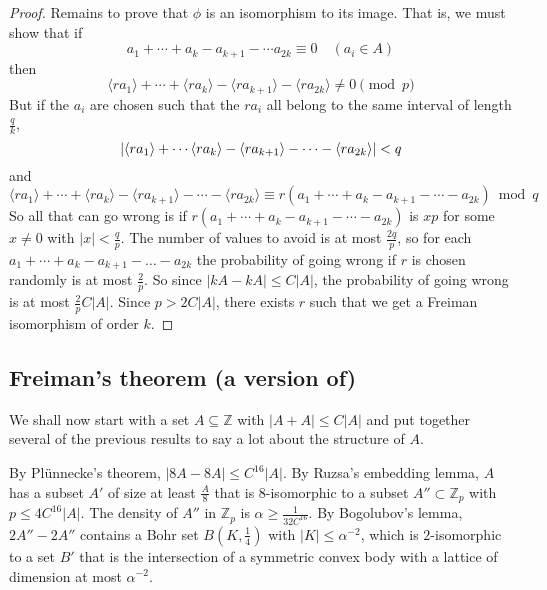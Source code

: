 \documentclass{article}
\newcommand{\1}[1]{\mathbbm{1}_{#1}}
\begin{document}
\begin{proof}
  Remains to prove that $\phi$ is an isomorphism to its image. That is, we must show that if
  \begin{equation*}
    a_1 + \dotsb + a_k - a_{k+1} - \dotsb a_{2k} \equiv 0 \quad (a_i \in A)
  \end{equation*}
  then
  \begin{equation*}
    \langle r a_1 \rangle + \dotsb + \langle r a_k \rangle - \langle r a_{k+1} \rangle - \langle r a_{2k} \rangle \neq 0 \pmod{p}
  \end{equation*}
  But if the $a_i$ are chosen such that the $r a_i$ all belong to the same interval of length $\frac{q}{k}$,
  \begin{equation*}
    |\langle r a_1 \rangle + \dotsb \langle r a_k \rangle - \langle r a_{k+1} \rangle - \dotsb - \langle r a_{2k} \rangle| < q \\
  \end{equation*}
  and
  \begin{equation*}
    \langle r a_1 \rangle + \dotsb + \langle r a_k \rangle - \langle r a_{k+1} \rangle - \dotsb - \langle r a_{2k} \rangle \equiv r(a_1 + \dotsb + a_k - a_{k+1} - \dotsb - a_{2k}) \bmod{q}
  \end{equation*}
  So all that can go wrong is if $r(a_1 + \dotsb + a_k - a_{k+1} - \dotsb - a_{2k})$ is $xp$ for some $x \neq 0$ with $|x| < \frac{q}{p}$.
  The number of values to avoid is at most $\frac{2q}{p}$, so for each $a_1 + \dotsb + a_k - a_{k+1} - \dotsc - a_{2k}$ the probability of going wrong if $r$ is chosen randomly is at most $\frac{2}{p}$.
  So since $|kA - kA| \leq C|A|$, the probability of going wrong is at most $\frac{2}{p} C |A|$.
  Since $p > 2 C |A|$, there exists $r$ such that we get a Freiman isomorphism of order $k$.
\end{proof}

\subsection{Freiman's theorem (a version of)}
We shall now start with a set $A \subseteq \mathbb{Z}$ with $|A+A| \leq C|A|$ and put together several of the previous results to say a lot about the structure of $A$.

By Pl\"unnecke's theorem, $|8A - 8A| \leq C^{16}|A|$. By Ruzsa's embedding lemma, $A$ has a subset $A'$ of size at least $\frac{A}{8}$ that is $8$-isomorphic to a subset $A'' \subset \mathbb{Z}_p$ with $p \leq 4 C^{16} |A|$.
The density of $A''$ in $\mathbb{Z}_p$ is $\alpha \geq \frac{1}{32 C^{16}}$.
By Bogolubov's lemma, $2A'' - 2A''$ contains a Bohr set $B(K, \frac{1}{4})$ with $|K| \leq \alpha^{-2}$, which is $2$-isomorphic to a set $B'$ that is the intersection of a symmetric convex body with a lattice of dimension at most $\alpha^{-2}$.
\end{document}
